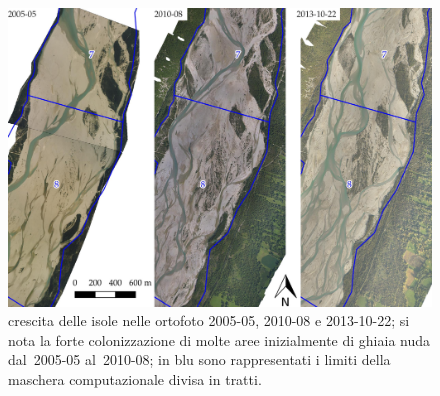 \begin{figure}
	\centering
	\includegraphics[width = \textwidth]{files/crescita_2005_2010_2013.jpeg}
	\caption[crescita delle isole nelle ortofoto 2005-05, 2010-08 e 2013-10-22]{crescita delle isole nelle ortofoto 2005-05, 2010-08 e 2013-10-22; si nota la forte colonizzazione di molte aree inizialmente di ghiaia nuda dal~2005-05 al~2010-08; in blu sono rappresentati i limiti della maschera computazionale divisa in tratti.}
	\label{fig:crescita-2005-2010-2013}
\end{figure}
%
